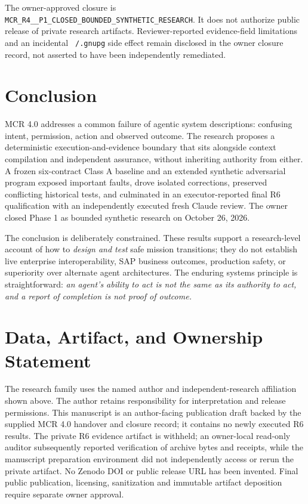 \documentclass[11pt,twocolumn]{article}
\newcommand{\code}[1]{\texttt{#1}}
\begin{document}
The owner-approved closure is \code{MCR\_\allowbreak R4\_\_\allowbreak P1\_\allowbreak CLOSED\_\allowbreak BOUNDED\_\allowbreak SYNTHETIC\_\allowbreak RESEARCH}. It does not authorize public release of private research artifacts. Reviewer-reported evidence-field limitations and an incidental \code{\string~/.gnupg} side effect remain disclosed in the owner closure record, not asserted to have been independently remediated.

\section{Conclusion}
MCR 4.0 addresses a common failure of agentic system descriptions: confusing intent, permission, action and observed outcome. The research proposes a deterministic execution-and-evidence boundary that sits alongside context compilation and independent assurance, without inheriting authority from either. A frozen six-contract Class A baseline and an extended synthetic adversarial program exposed important faults, drove isolated corrections, preserved conflicting historical tests, and culminated in an executor-reported final R6 qualification with an independently executed fresh Claude review. The owner closed Phase 1 as bounded synthetic research on October 26, 2026.

The conclusion is deliberately constrained. These results support a research-level account of how to \emph{design and test} safe mission transitions; they do not establish live enterprise interoperability, SAP business outcomes, production safety, or superiority over alternate agent architectures. The enduring systems principle is straightforward: \emph{an agent's ability to act is not the same as its authority to act, and a report of completion is not proof of outcome.}

\section*{Data, Artifact, and Ownership Statement}
The research family uses the named author and independent-research affiliation shown above. The author retains responsibility for interpretation and release permissions. This manuscript is an author-facing publication draft backed by the supplied MCR 4.0 handover and closure record; it contains no newly executed R6 results. The private R6 evidence artifact is withheld; an owner-local read-only auditor subsequently reported verification of archive bytes and receipts, while the manuscript preparation environment did not independently access or rerun the private artifact. No Zenodo DOI or public release URL has been invented. Final public publication, licensing, sanitization and immutable artifact deposition require separate owner approval.
\end{document}
